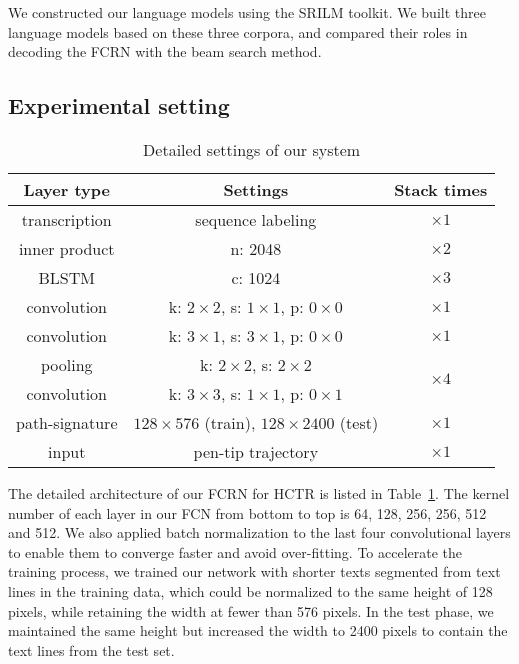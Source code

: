 \documentclass[10pt,conference,a4paper]{IEEEtran}
\begin{document}
We constructed our language models using the SRILM toolkit\cite{stolcke2002srilm}. We built three language models based on these three corpora, and compared their roles in decoding the FCRN with the beam search method.



\subsection{Experimental setting}
\begin{table}[t]
\caption{Detailed settings of our system}
\label{TableFCRNArchitecture}
\begin{tabular}{|c|c|c|}
\hline
Layer type            &Settings               &Stack times    \\
\hline
transcription   &sequence labeling          &$\times 1$     \\
\hline
inner product   &n: 2048                     &$\times 2$     \\
\hline
BLSTM           &c: 1024                     &$\times 3$     \\
\hline
convolution     &k: $2\times 2$, s: $1\times 1$, p: $0\times 0$     &$\times 1$  \\
\hline
convolution     &k: $3\times 1$, s: $3\times 1$, p: $0\times 0$     &$\times 1$  \\
\hline
pooling         &k: $2\times 2$, s: $2\times 2$                   &\multirow{2}{*}{$\times 4$}  \\
\cline{1-2}
convolution     &k: $3\times 3$, s: $1\times 1$, p: $0\times 1$      &          \\
\hline
path-signature  &$128\times 576$ (train), $128\times 2400$ (test)  &$\times 1$ \\
\hline
input           &pen-tip trajectory                             &$\times 1$  \\
\hline
\end{tabular}
\end{table}
The detailed architecture of our FCRN for HCTR is listed in Table~\ref{TableFCRNArchitecture}.
The kernel number of each layer in our FCN from bottom to top is 64, 128, 256, 256, 512 and 512.
We also applied batch normalization\cite{ioffe2015batch} to the last four convolutional layers to enable them to converge faster and avoid over-fitting.
To accelerate the training process, we trained our network with shorter texts segmented from text lines in the training data, which could be normalized to the same height of 128 pixels, while retaining the width at fewer than 576 pixels.
In the test phase, we maintained the same height but increased the width to 2400 pixels to contain the text lines from the test set.
\end{document}
